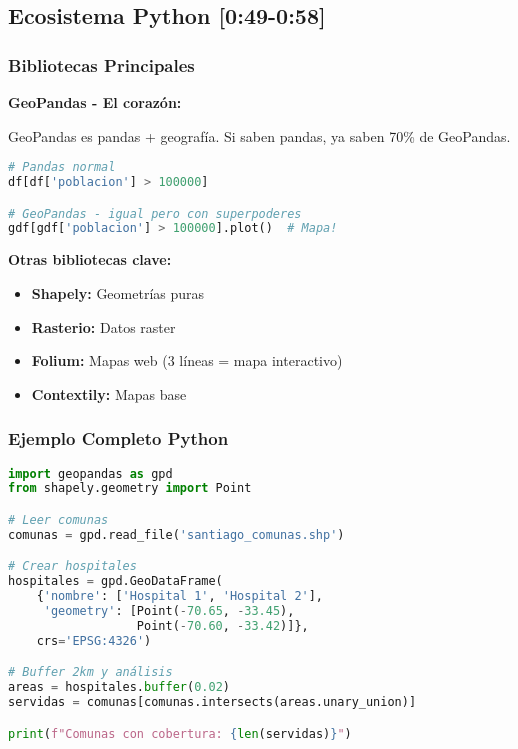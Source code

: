 \documentclass[11pt,a4paper]{article}
\newcommand{\tiempo}[1]{\textcolor{timecolor}{\textbf{[#1]}}}
\newcommand{\decir}[1]{\begin{tcolorbox}[colback=blue!5,colframe=usachblue,title={DECIR}]#1\end{tcolorbox}}
\begin{document}
\subsection{Ecosistema Python \tiempo{0:49-0:58}}

\subsubsection{Bibliotecas Principales}

\textbf{GeoPandas - El corazón:}

\decir{GeoPandas es pandas + geografía. Si saben pandas, ya saben 70\% de GeoPandas.}

\begin{lstlisting}[language=Python]
# Pandas normal
df[df['poblacion'] > 100000]

# GeoPandas - igual pero con superpoderes
gdf[gdf['poblacion'] > 100000].plot()  # Mapa!
\end{lstlisting}

\textbf{Otras bibliotecas clave:}
\begin{itemize}
    \item \textbf{Shapely:} Geometrías puras
    \item \textbf{Rasterio:} Datos raster
    \item \textbf{Folium:} Mapas web (3 líneas = mapa interactivo)
    \item \textbf{Contextily:} Mapas base
\end{itemize}

\subsubsection{Ejemplo Completo Python}

\begin{lstlisting}[language=Python]
import geopandas as gpd
from shapely.geometry import Point

# Leer comunas
comunas = gpd.read_file('santiago_comunas.shp')

# Crear hospitales
hospitales = gpd.GeoDataFrame(
    {'nombre': ['Hospital 1', 'Hospital 2'],
     'geometry': [Point(-70.65, -33.45), 
                  Point(-70.60, -33.42)]},
    crs='EPSG:4326')

# Buffer 2km y análisis
areas = hospitales.buffer(0.02)
servidas = comunas[comunas.intersects(areas.unary_union)]

print(f"Comunas con cobertura: {len(servidas)}")
\end{lstlisting}
\end{document}
